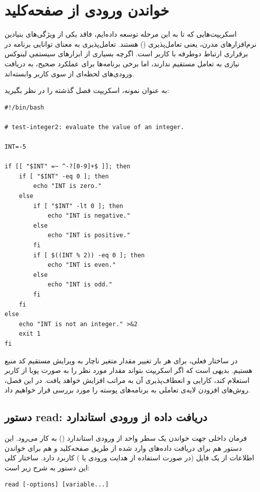 \chapter{خواندن ورودی از صفحه‌کلید}

اسکریپت‌هایی که تا به این مرحله توسعه داده‌ایم، فاقد یکی از ویژگی‌های بنیادین نرم‌افزارهای مدرن، یعنی تعامل‌پذیری () هستند. تعامل‌پذیری به معنای توانایی برنامه در برقراری ارتباط دوطرفه با کاربر است. اگرچه بسیاری از ابزارهای سیستمی لینوکس نیازی به تعامل مستقیم ندارند، اما برخی برنامه‌ها برای عملکرد صحیح، به دریافت ورودی‌های لحظه‌ای از سوی کاربر وابسته‌اند.

به عنوان نمونه، اسکریپت فصل گذشته را در نظر بگیرید:

\begin{latin}
\begin{lstlisting}
#!/bin/bash

# test-integer2: evaluate the value of an integer.

INT=-5

if [[ "$INT" =~ ^-?[0-9]+$ ]]; then
    if [ "$INT" -eq 0 ]; then
        echo "INT is zero."
    else
        if [ "$INT" -lt 0 ]; then
            echo "INT is negative."
        else
            echo "INT is positive."
        fi
        if [ $((INT % 2)) -eq 0 ]; then
            echo "INT is even."
        else
            echo "INT is odd."
        fi
    fi
else
    echo "INT is not an integer." >&2
    exit 1
fi
\end{lstlisting}
\end{latin}

در ساختار فعلی، برای هر بار تغییر مقدار متغیر  ناچار به ویرایش مستقیم کد منبع هستیم. بدیهی است که اگر اسکریپت بتواند مقدار مورد نظر را به صورت پویا از کاربر استعلام کند، کارایی و انعطاف‌پذیری آن به مراتب افزایش خواهد یافت. در این فصل، روش‌های افزودن لایه‌ی تعاملی به برنامه‌های پوسته را مورد بررسی قرار خواهیم داد.

\section{دستور read: دریافت داده از ورودی استاندارد}

فرمان داخلی  جهت خواندن یک سطر واحد از ورودی استاندارد () به کار می‌رود. این دستور هم برای دریافت داده‌های وارد شده از طریق صفحه‌کلید و هم برای خواندن اطلاعات از یک فایل (در صورت استفاده از هدایت ورودی یا ) کاربرد دارد. ساختار کلی این دستور به شرح زیر است:

\begin{latin}
\begin{lstlisting}
read [-options] [variable...]
\end{lstlisting}
\end{latin}

